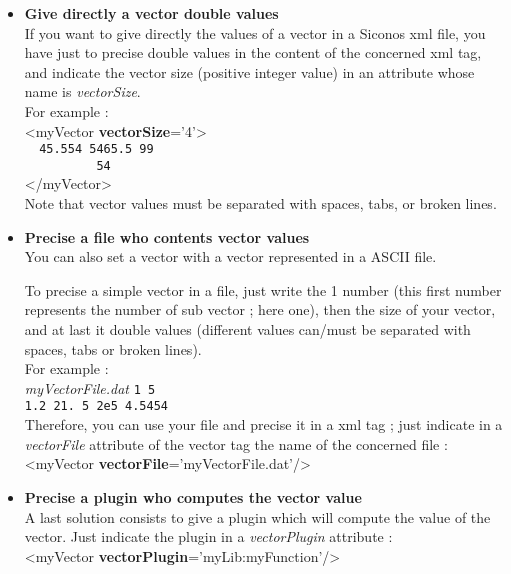 \begin{itemize}

\item \textbf{Give directly a vector double values}\\

If you want to give directly the values of a vector in a Siconos \ac{xml} file, you have just to precise double values in the content of the concerned
 \ac{xml} tag, and indicate the vector size (positive integer value) in an attribute whose name is \textit{vectorSize}.\\


For example : \\

<myVector \textbf{vectorSize}='4'>\\
\verb+  45.554 5465.5 99+ \\
\verb+			54 +\\
</myVector>\\


Note that vector values must be separated with spaces, tabs, or broken lines.\\


\item \textbf{Precise a file who contents vector values}\\

You can also set a vector with a vector represented in a ASCII file.

To precise a simple vector in a file, just write the 1 number (this first number represents the number of sub vector ; here one), then the size of your vector, and at last it double values (different values can/must be separated with spaces, tabs or
broken lines). \\

For example : \\
\textit{myVectorFile.dat}
\verb+1	5 +\\
\verb+1.2 21. 5 2e5 4.5454+\\


Therefore, you can use your file and precise it in a \ac{xml} tag ; just indicate in a \textit{vectorFile} attribute of the vector tag the name of the concerned file :\\

<myVector \textbf{vectorFile}='myVectorFile.dat'/>\\


\item \textbf{Precise a plugin who computes the vector value}\\

A last solution consists to give a plugin which will compute the value of the vector. Just indicate the plugin in a \textit{vectorPlugin} attribute : \\

<myVector \textbf{vectorPlugin}='myLib:myFunction'/>\\

\end{itemize}


